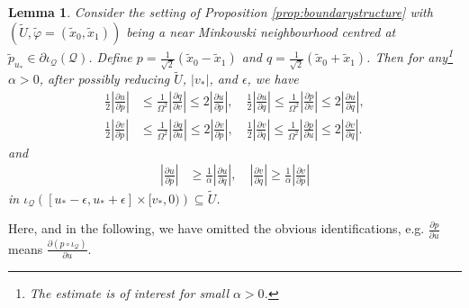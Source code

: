 \documentclass{article}
\newcommand{\Q}{\mathcal{Q}}
\newcommand{\rd}{\partial}
\newtheorem{lemma}[definition]{Lemma}
\begin{document}
\begin{lemma}\label{lemma:derivativecontrol} Consider the setting of Proposition \ref{prop:boundarystructure} with $(\tilde{U},\tilde{\varphi}=(\tilde{x}_0,\tilde{x}_1))$ being a near Minkowski neighbourhood centred at $\tilde{p}_{u_*}\in \partial\iota_\Q(\Q)$.  Define $p=\frac{1}{\sqrt{2}}(\tilde{x}_0-\tilde{x}_1)$ and $q=\frac{1}{\sqrt{2}}(\tilde{x}_0+\tilde{x}_1)$. Then for any\footnote{The estimate is of interest for small $\alpha >0$.} $\alpha>0$, after possibly reducing $\tilde{U}$, $|v_*|$, and $\epsilon$, we have
               \begin{equation}\label{eqn:derivbounds}
                    \begin{split}
                     \frac{1}{ 2}\left|\frac{\partial u}{\partial p}\right|&\leq \frac{1}{\Omega^2}\left|\frac{\partial q}{\partial v}\right|\leq  2\left|\frac{\partial u}{\partial p}\right|,\quad
        \frac{1}{ 2}\left|\frac{\partial u}{\partial q}\right|\leq \frac{1}{\Omega^2}\left|\frac{\partial p}{\partial v}\right|\leq  2\left|\frac{\partial u}{\partial q}\right|,\\
        \frac{1}{ 2}\left|\frac{\partial v}{\partial p}\right|&\leq \frac{1}{\Omega^2}\left|\frac{\partial q}{\partial u}\right|\leq  2\left|\frac{\partial v}{\partial p}\right|,\quad
        \frac{1}{ 2}\left|\frac{\partial v}{\partial q}\right|\leq \frac{1}{\Omega^2}\left|\frac{\partial p}{\partial u}\right|\leq  2\left|\frac{\partial v}{\partial q}\right|.
\end{split}
\end{equation}
and     
\begin{equation}\label{eqn:gradientboundderivs}
    \begin{split}
                \left|\frac{\partial u}{\partial p}\right|&\geq \frac{1}{\alpha}\left|\frac{\partial u}{\partial q}\right|,\quad\left|\frac{\partial v}{\partial q}\right|\geq \frac{1}{\alpha}\left|\frac{\partial v}{\partial p}\right|
                \end{split}
                \end{equation}
in $\iota_\Q\left([u_*-\epsilon,u_*+\epsilon]\times[v_*,0)\right) \subseteq \tilde{U}$.
\end{lemma}

Here, and in the following, we have omitted the obvious identifications, e.g. $\frac{\rd p}{\rd u}$ means $\frac{\rd (p\circ\iota_\Q)}{\rd u}$.
\end{document}
